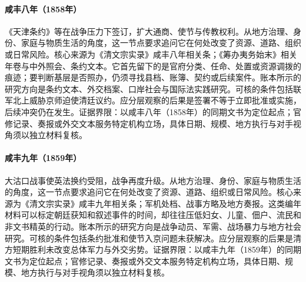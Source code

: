 \hypertarget{social:EQ-1858-TIANJIN-TREATIES}{}\paragraph{咸丰八年（1858年）}《天津条约》等在战争压力下签订，扩大通商、使节与传教权利。从地方治理、身份、家庭与物质生活的角度，这一节点要求追问它在何处改变了资源、道路、组织或日常风险。核心来源为《清文宗实录》咸丰八年相关条；《筹办夷务始末》相关年卷与中外照会、条约文本。它首先留下的是官府分类、任命、处置或资源调拨的痕迹；要判断基层是否照办，仍须寻找县档、账簿、契约或后续案件。账本所示的研究方向是条约文本、外交档案、口岸社会与国际法实践研究。可核的条件包括联军北上威胁京师迫使清廷议约。应分层观察的后果是签署不等于立即批准或实施，后续冲突仍在发生。证据界限：以咸丰八年（1858年）的同期文书为定位起点；官修记录、奏报或外交文本服务特定机构立场，具体日期、规模、地方执行与对手视角须以独立材料复核。
\hypertarget{social:EQ-1859-TAKU-BATTLE}{}\paragraph{咸丰九年（1859年）}大沽口战事使英法换约受阻，战争再度升级。从地方治理、身份、家庭与物质生活的角度，这一节点要求追问它在何处改变了资源、道路、组织或日常风险。核心来源为《清文宗实录》咸丰九年相关条；军机处档、战事方略及地方奏报。这类编年材料可以标定朝廷获知和叙述事件的时间，却往往压低妇女、儿童、佃户、流民和非文书精英的行动。账本所示的研究方向是战争动员、军需、战场暴力与地方社会研究。可核的条件包括条约批准和使节入京问题未获解决。应分层观察的后果是清方短期胜利未改变总体军力与外交劣势。证据界限：以咸丰九年（1859年）的同期文书为定位起点；官修记录、奏报或外交文本服务特定机构立场，具体日期、规模、地方执行与对手视角须以独立材料复核。
